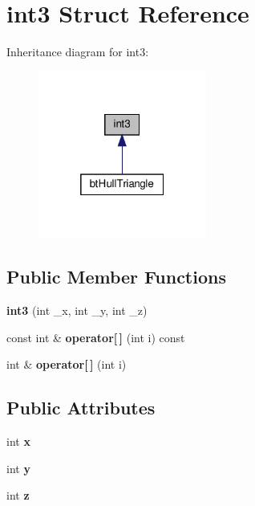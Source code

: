 \hypertarget{structint3}{}\section{int3 Struct Reference}
\label{structint3}


Inheritance diagram for int3\+:
\nopagebreak
\begin{figure}[H]
\begin{center}
\leavevmode
\includegraphics[width=157pt]{structint3__inherit__graph}
\end{center}
\end{figure}
\subsection*{Public Member Functions}
\begin{DoxyCompactItemize}
\item 
\mbox{\label{structint3_a7eb209ad94b37395d5b70fd97688fefa}} 
{\bfseries int3} (int \+\_\+x, int \+\_\+y, int \+\_\+z)
\item 
\mbox{\label{structint3_a224dc30b2aeed14bcd919e63eb9686f7}} 
const int \& {\bfseries operator\mbox{[}$\,$\mbox{]}} (int i) const
\item 
\mbox{\label{structint3_a63600dcd35d1d8a1f7ba9969d0ca220a}} 
int \& {\bfseries operator\mbox{[}$\,$\mbox{]}} (int i)
\end{DoxyCompactItemize}
\subsection*{Public Attributes}
\begin{DoxyCompactItemize}
\item 
\mbox{\label{structint3_a0a4ad50a155a35fa938ce6f16930affa}} 
int {\bfseries x}
\item 
\mbox{\label{structint3_a5d95e23491677d61019f0354b16adca9}} 
int {\bfseries y}
\item 
\mbox{\label{structint3_a5cd5a3c388fa28814e3496ef07c39360}} 
int {\bfseries z}
\end{DoxyCompactItemize}


